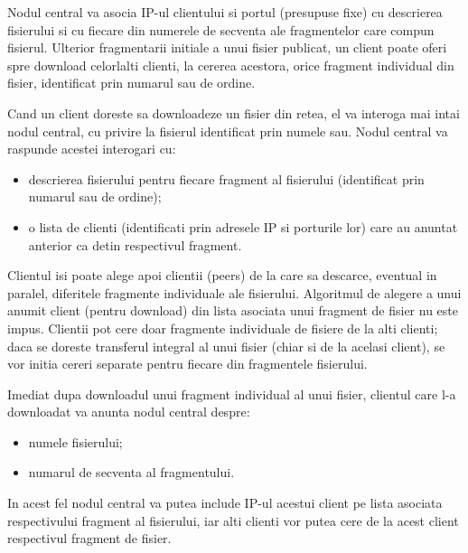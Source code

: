 \documentclass[a4paper]{article}
\begin{document}
\par Nodul central va asocia IP-ul clientului si portul (presupuse fixe) cu descrierea fisierului si cu fiecare din numerele de secventa ale fragmentelor care compun fisierul. Ulterior fragmentarii initiale a unui fisier publicat, un client poate oferi spre download celorlalti clienti, la cererea acestora, orice fragment individual din fisier, identificat prin numarul sau de ordine.

\par Cand un client doreste sa downloadeze un fisier din retea, el va interoga mai intai nodul central, cu privire la fisierul identificat prin numele sau. Nodul central va raspunde acestei interogari cu:

\begin{itemize}[noitemsep]
	\item descrierea fisierului pentru fiecare fragment al fisierului (identificat prin numarul sau de ordine);
	\item o lista de clienti (identificati prin adresele IP si porturile lor) care au anuntat anterior ca detin respectivul fragment.
\end{itemize}

\par Clientul isi poate alege apoi clientii (peers) de la care sa descarce, eventual in paralel, diferitele fragmente individuale ale fisierului. Algoritmul de alegere a unui anumit client (pentru download) din lista asociata unui fragment de fisier nu este impus. Clientii pot cere doar fragmente individuale de fisiere de la alti clienti; daca se doreste transferul integral al unui fisier (chiar si de la acelasi client), se vor initia cereri separate pentru fiecare din fragmentele fisierului.

\par Imediat dupa downloadul unui fragment individual al unui fisier, clientul care l-a downloadat va anunta nodul central despre:

\begin{itemize}[noitemsep]
	\item numele fisierului;
	\item numarul de secventa al fragmentului.
\end{itemize}

\par In acest fel nodul central va putea include IP-ul acestui client pe lista asociata respectivului fragment al fisierului, iar alti clienti vor putea cere de la acest client respectivul fragment de fisier.
\end{document}
